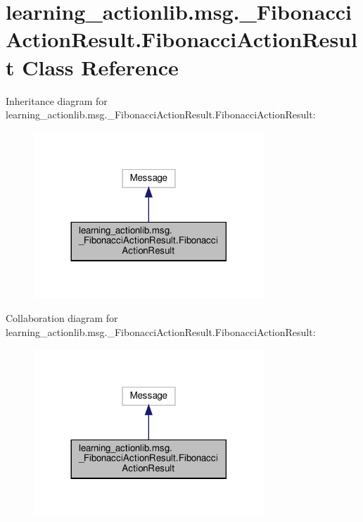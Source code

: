 \hypertarget{classlearning__actionlib_1_1msg_1_1__FibonacciActionResult_1_1FibonacciActionResult}{}\section{learning\+\_\+actionlib.\+msg.\+\_\+\+Fibonacci\+Action\+Result.\+Fibonacci\+Action\+Result Class Reference}
\label{classlearning__actionlib_1_1msg_1_1__FibonacciActionResult_1_1FibonacciActionResult}


Inheritance diagram for learning\+\_\+actionlib.\+msg.\+\_\+\+Fibonacci\+Action\+Result.\+Fibonacci\+Action\+Result\+:
\nopagebreak
\begin{figure}[H]
\begin{center}
\leavevmode
\includegraphics[width=245pt]{classlearning__actionlib_1_1msg_1_1__FibonacciActionResult_1_1FibonacciActionResult__inherit__graph}
\end{center}
\end{figure}


Collaboration diagram for learning\+\_\+actionlib.\+msg.\+\_\+\+Fibonacci\+Action\+Result.\+Fibonacci\+Action\+Result\+:
\nopagebreak
\begin{figure}[H]
\begin{center}
\leavevmode
\includegraphics[width=245pt]{classlearning__actionlib_1_1msg_1_1__FibonacciActionResult_1_1FibonacciActionResult__coll__graph}
\end{center}
\end{figure}
